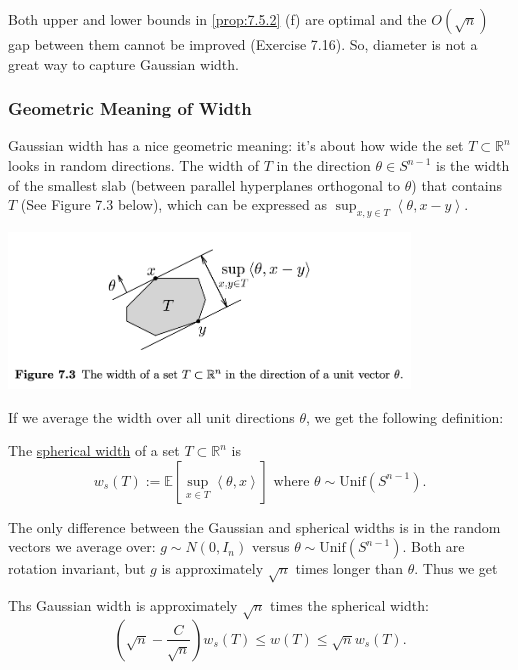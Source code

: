 \begin{remark}
\label{rmk:7.5.3}
Both upper and lower bounds in \cref{prop:7.5.2} (f) are optimal and the $O(\sqrt{n})$ gap between them cannot 
be improved (Exercise 7.16). So, diameter is not a great way to capture Gaussian width.
\end{remark}


\subsubsection{Geometric Meaning of Width}
Gaussian width has a nice geometric meaning: it's about how wide the set $T \subset \mathbb{R}^n$ looks in 
random directions. The width of $T$ in the direction $\theta \in S^{n - 1}$ is the width of the smallest slab 
(between parallel hyperplanes orthogonal to $\theta$) that contains $T$ (See Figure 7.3 below), which can be 
expressed as $\sup_{x, y \in T}\left\langle \theta, x - y \right\rangle$. 

\begin{center}
	\includegraphics[width=0.8\textwidth]{Chapter 7/fig7-3.png}
\end{center}

If we average the width over all unit directions $\theta$, we get the following definition:

\begin{definition}[]
\label{def:7.5.4}
The \underline{spherical width} of a set $T \subset \mathbb{R}^n$ is 
\[ w_s(T) := \mathbb{E}\left[ \sup_{x \in T} \left\langle \theta, x \right\rangle \right] 
\text{ where } \theta \sim \mathrm{Unif}(S^{n - 1}). \]
\end{definition}

The only difference between the Gaussian and spherical widths is in the random vectors we average over: 
$g \sim N(0, I_n)$ versus $\theta \sim \mathrm{Unif}(S^{n - 1})$. Both are rotation invariant, but $g$ is 
approximately $\sqrt{n}$ times longer than $\theta$. Thus we get 

\begin{lemma}
\label{lem:7.5.5}
Ths Gaussian width is approximately $\sqrt{n}$ times the spherical width:
\[ \left( \sqrt{n} - \frac{C}{\sqrt{n}} \right)w_s(T) \leq w(T) \leq \sqrt{n}w_s(T). \]
\end{lemma}

